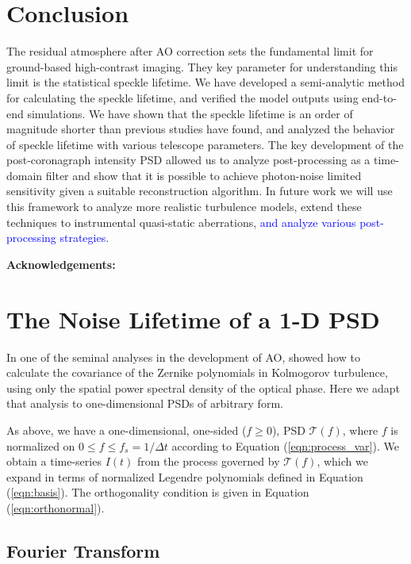 \documentclass[10pt,preprint]{aastex631}
\newcommand{\jrmadd}[1]{\textcolor{blue}{#1}}
\begin{document}
\section{Conclusion}
The residual atmosphere after AO correction sets the fundamental limit for ground-based high-contrast imaging.  They key parameter for understanding this limit is the statistical speckle lifetime.  We have developed a semi-analytic method for calculating the speckle lifetime, and verified the model outputs using end-to-end simulations.  We have shown that the speckle lifetime is an order of magnitude shorter than previous studies have found, and analyzed the behavior of speckle lifetime with various telescope parameters.  The key development of the post-coronagraph intensity PSD allowed us to analyze post-processing as a time-domain filter and show that it is possible to achieve photon-noise limited sensitivity given a suitable reconstruction algorithm. In future work we will use this framework to analyze more realistic turbulence models, extend these techniques to instrumental quasi-static aberrations, \jrmadd{and analyze various post-processing strategies}.  

\textbf{Acknowledgements:}

\clearpage
\appendix
\section{The Noise Lifetime of a 1-D PSD}
\label{app:tau_psd}

In one of the seminal analyses in the development of AO, \citet{1976JOSA...66..207N} showed how to calculate the covariance of the Zernike polynomials in Kolmogorov turbulence, using only the spatial power spectral density of the optical phase. Here we adapt that analysis to one-dimensional PSDs of arbitrary form.  

As above, we have a one-dimensional, one-sided ($f \ge 0$),  PSD $\mathcal{T}(f)$, where $f$ is normalized on $0 \leq f \leq f_s = 1/\Delta t$ according to Equation (\ref{eqn:process_var}).  We obtain a time-series $I(t)$ from the process governed by $\mathcal{T}(f)$, which we expand in terms of normalized Legendre polynomials defined in Equation (\ref{eqn:basis}).  The orthogonality condition is given in Equation (\ref{eqn:orthonormal}).
 
\subsection{Fourier Transform}
\end{document}
